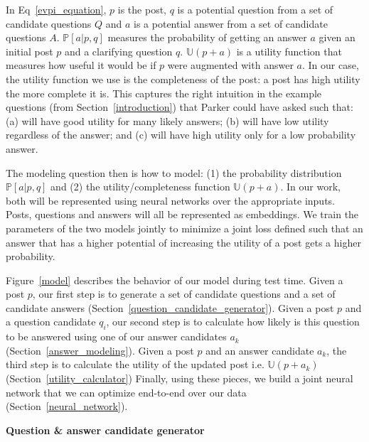 \documentclass[11pt]{article}
\newcommand{\U}{\mathbb{U}}
\begin{document}
In Eq~\ref{evpi_equation}, $p$ is the post, $q$ is a potential question from a set of candidate questions $Q$ and $a$ is a potential answer from a set of candidate questions $A$. $\mathbb{P}[a | p,q]$ measures the probability of getting an answer $a$ given an initial post $p$ and a clarifying question $q$. $\U(p+a)$ is a utility function that measures how useful it would be if $p$ were augmented with answer $a$. In our case, the utility function we use is the completeness of the post: a post has high utility the more complete it is. This captures the right intuition in the example questions (from Section~\ref{introduction}) that Parker could have asked such that: \textsf{\small (a)} will have good utility for many likely answers;
\textsf{\small (b)} will have low utility regardless of the answer; and
\textsf{\small (c)} will have high utility only for a low probability answer.

The modeling question then is how to model: 
(1) the probability distribution $\mathbb{P}[a | p,q]$ and
(2) the utility/completeness function $\U(p+a)$.
In our work, both will be represented using neural networks over the appropriate inputs. Posts, questions and answers will all be represented as embeddings. We train the parameters of the two models jointly to minimize a joint loss defined such that an answer that has a higher potential of increasing the utility of a post gets a higher probability.

Figure~\ref{model} describes the behavior of our model during test time. 
Given a post $p$, our first step is to generate a set of candidate questions and a set of candidate answers (Section~\ref{question_candidate_generator}).
Given a post $p$ and a question candidate $q_i$, our second step is to calculate how likely is this question to be answered using one of our answer candidates $a_k$ (Section~\ref{answer_modeling}).
Given a post $p$ and an answer candidate $a_k$, the third step is to calculate the utility of the updated post i.e. $\U(p + a_k)$ (Section~\ref{utility_calculator})
Finally, using these pieces, we build a joint neural network that we can optimize end-to-end over our data (Section~\ref{neural_network}).

\textbf{Question \& answer candidate generator}\label{question_candidate_generator}\\\\
\end{document}
